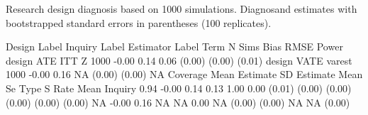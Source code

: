 \documentclass[
  11pt,
]{article}
\newenvironment{Shaded}{\begin{snugshade}}{\end{snugshade}}
\newcommand{\AttributeTok}[1]{\textcolor[rgb]{0.77,0.63,0.00}{#1}}
\newcommand{\DecValTok}[1]{\textcolor[rgb]{0.00,0.00,0.81}{#1}}
\newcommand{\DocumentationTok}[1]{\textcolor[rgb]{0.56,0.35,0.01}{\textbf{\textit{#1}}}}
\newcommand{\FloatTok}[1]{\textcolor[rgb]{0.00,0.00,0.81}{#1}}
\newcommand{\FunctionTok}[1]{\textcolor[rgb]{0.00,0.00,0.00}{#1}}
\newcommand{\NormalTok}[1]{#1}
\newcommand{\OtherTok}[1]{\textcolor[rgb]{0.56,0.35,0.01}{#1}}
\newcommand{\SpecialCharTok}[1]{\textcolor[rgb]{0.00,0.00,0.00}{#1}}
\newcommand{\StringTok}[1]{\textcolor[rgb]{0.31,0.60,0.02}{#1}}
\begin{document}
\begin{Shaded}
\end{Shaded}

Research design diagnosis based on 1000 simulations. Diagnosand
estimates with bootstrapped standard errors in parentheses (100
replicates).

Design Label Inquiry Label Estimator Label Term N Sims Bias RMSE Power
design ATE ITT Z 1000 -0.00 0.14 0.06 (0.00) (0.00) (0.01) design VATE
varest 1000 -0.00 0.16 NA (0.00) (0.00) NA Coverage Mean Estimate SD
Estimate Mean Se Type S Rate Mean Inquiry 0.94 -0.00 0.14 0.13 1.00 0.00
(0.01) (0.00) (0.00) (0.00) (0.00) (0.00) NA -0.00 0.16 NA NA 0.00 NA
(0.00) (0.00) NA NA (0.00)
\end{document}
